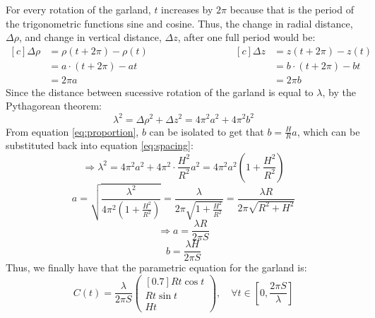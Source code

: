 For every rotation of the garland, $t$ increases by $2\pi$ because that is the period of the trigonometric functions sine and cosine. Thus, the change in radial distance, $\Delta \rho$, and change in vertical distance, $\Delta z$, after one full period would be:
\begin{equation*}
    \begin{aligned}[c]
        \Delta \rho & = \rho(t+2\pi) -\rho(t) \\
                    & = a\cdot(t+2\pi) - at   \\
                    & = 2\pi a
    \end{aligned}
    \qquad\qquad\qquad\qquad
    \begin{aligned}[c]
        \Delta z & = z(t+2\pi) -z(t)     \\
                 & = b\cdot(t+2\pi) - bt \\
                 & = 2\pi b
    \end{aligned}
\end{equation*}
Since the distance between sucessive rotation of the garland is equal to $\lambda$, by the Pythagorean theorem:
\begin{equation}
    \lambda^2 = \Delta \rho^2 + \Delta z^2 =4\pi^2a^2+4\pi^2b^2 \label{eq:spacing}
\end{equation}
From equation \ref{eq:proportion}, $b$ can be isolated to get that $b = \frac{H}{R}a$, which can be substituted back into equation \ref{eq:spacing}:
\begin{equation*}
    \Rightarrow \lambda^2 = 4\pi^2a^2+4\pi^2\cdot\frac{H^2}{R^2} a^2 = 4\pi^2a^2\left(1+\frac{H^2}{R^2} \right)
\end{equation*}
\begin{equation*}
    a = \sqrt{\frac{\lambda^2}{4\pi^2(1+\frac{H^2}{R^2})}} = \frac{\lambda}{2\pi\sqrt{1+\frac{H^2}{R^2}}} = \frac{\lambda R}{2\pi\sqrt{R^2+H^2}}
\end{equation*}
\begin{equation}
    \Rightarrow a =\frac{\lambda R}{2\pi S}
\end{equation}
\begin{equation}
    b =\frac{\lambda H}{2\pi S}
\end{equation}
Thus, we finally have that the parametric equation for the garland is:
\begin{equation}
    C(t) = \frac{\lambda}{2\pi S}
    \begin{pmatrix}[0.7]
        Rt\cos{t} \\
        Rt\sin{t} \\
        Ht
    \end{pmatrix}, \quad \forall t \in \left[0, \frac{2\pi S}{\lambda}\right]
\end{equation}
